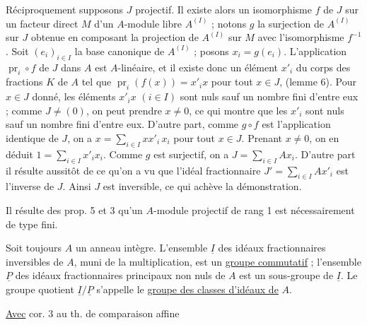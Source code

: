 Réciproquement supposons $J$ projectif. Il existe alors un isomorphisme $f$ de $J$ sur un facteur direct $M$ d'un $A$-module libre $A^{(I)}$ ; notons $g$ la surjection de $A^{(I)}$ sur $J$ obtenue en composant la projection de $A^{(I)}$ sur $M$ avec l'isomorphisme $f^{-1}$. Soit $(e_i)_{i\in I}$ la base canonique de $A^{(I)}$ ; posons $x_i=g(e_i)$. L'application $\operatorname{pr}_i\circ f$ de $J$ dans $A$ est $A$-linéaire, et il existe donc un élément $x'_i$ du corps des fractions $K$ de $A$ tel que $\operatorname{pr}_i(f(x))=x'_i x$ pour tout $x\in J$, (lemme 6). Pour $x\in J$ donné, les éléments $x'_i x$ $(i\in I)$ sont nuls sauf un nombre fini d'entre eux ; comme $J\ne(0)$, on peut prendre $x\ne0$, ce qui montre que les $x'_i$ sont nuls sauf un nombre fini d'entre eux. D'autre part, comme $g\circ f$ est l'application identique de $J$, on a $x=\displaystyle\sum_{i\in I}xx'_i\,x_i$ pour tout $x\in J$. Prenant $x\ne0$, on en déduit $1=\displaystyle\sum_{i\in I}x'_i x_i$. Comme $g$ est surjectif, on a $J=\displaystyle\sum_{i\in I}Ax_i$. D'autre part il résulte aussitôt de ce qu'on a vu que l'idéal fractionnaire $J'=\displaystyle\sum_{i\in I}Ax'_i$ est l'inverse de $J$. Ainsi $J$ est inversible, ce qui achève la démonstration.

Il résulte des prop. 5 et 3 qu'un $A$-module projectif de rang 1 est nécessairement de type fini.

Soit toujours $A$ un anneau intègre. L'ensemble $\underline I$ des idéaux fractionnaires inversibles de $A$, muni de la multiplication, est un \uline{groupe commutatif} ; l'ensemble $\underline P$ des idéaux fractionnaires principaux non nuls de $A$ est un sous-groupe de $\underline I$. Le groupe quotient $\underline I/\underline P$ s'appelle le \uline{groupe des classes d'idéaux de} $A$.

\uline{Avec} cor. 3 au th. de comparaison affine

